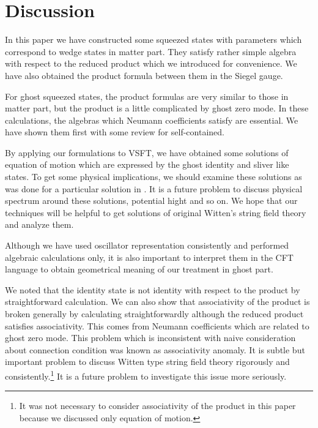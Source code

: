 \documentclass[12pt,a4paper]{article}
\begin{document}
\section{Discussion \label{sec:DIS}}

In this paper we have constructed some squeezed states \coordHE{} with parameters \myHighlight{$\xi,\eta$}\coordHE{} which correspond to wedge states in matter part. They satisfy rather simple algebra with respect to the reduced \coordHE{} product which we introduced for convenience. We have also obtained the \myHighlight{$\star$}\coordHE{} product formula between them in the Siegel gauge. 

For ghost squeezed states, the \coordHE{} product formulas are very similar to those in matter part, but the \myHighlight{$\star$}\coordHE{} product is a little complicated by ghost zero mode.
In these calculations, the algebras which Neumann coefficients satisfy are essential. We have shown them first with some review for self-contained.

By applying our formulations to VSFT, we have obtained some solutions of equation of motion which are expressed by the ghost identity and sliver like states. To get some physical implications, we should examine these solutions as was done for a particular solution in \cite{HK}. It is a future problem to discuss physical spectrum around these solutions, potential hight and so on.
We hope that our techniques will be helpful to get solutions of original Witten's string field theory and analyze them.

Although we have used oscillator representation consistently and performed algebraic calculations only, it is also important to interpret them in the CFT language to obtain geometrical meaning of our treatment in ghost part.

We noted that the identity state \coordHE{} is not identity with respect to the \myHighlight{$\star$}\coordHE{} product by straightforward calculation. 
We can also show that associativity of the \myHighlight{$\star$}\coordHE{} product is broken generally by calculating  \coordHE{}  straightforwardly although the reduced \coordHE{} product satisfies associativity. This comes from Neumann coefficients \coordHE{} which are related to ghost zero mode. This problem which is inconsistent with naive consideration about connection condition was known as associativity anomaly.\cite{STR}  It is subtle but important problem to discuss Witten type string field theory rigorously and consistently.\footnote{
It was not necessary to consider associativity of the \myHighlight{$\star$}\coordHE{} product
in this paper because we discussed only equation of motion. 
} It is a future problem to investigate this issue more seriously.
\end{document}
